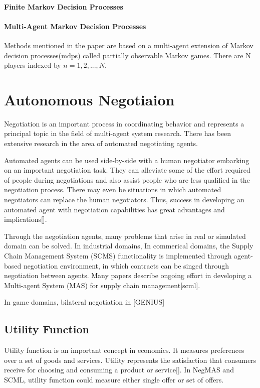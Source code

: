 \paragraph{Finite Markov Decision Processes}

\paragraph{Multi-Agent Markov Decision Processes} Methods mentioned in the paper are based on a multi-agent extension of Markov decision processes(\gls{mdps}) called partially observable Markov games. There are N players indexed by $n=1,2,...,N$.

\section{Autonomous Negotiaion} \label{autonomous-negotiation}
Negotiation is an important process in coordinating behavior and represents a principal topic in the field of multi-agent system research. There has been extensive research in the area of automated negotiating agents. 

Automated agents can be used side-by-side with a human negotiator embarking on an important negotiation task. They can alleviate some of the effort required of people during negotiations and also assist people who are less qualified in the negotiation process. There may even be situations in which automated negotiators can replace the human negotiators. Thus, success in developing an automated agent with negotiation capabilities
has great advantages and implications[].

Through the negotiation agents, many problems that arise in real or simulated domain can be solved. 
In industrial domains, 
In commerical  domains, the Supply Chain Management System (SCMS)
functionality is implemented through agent-based negotiation environment, in which contracts can be singed through negotiation between agents. Many papers describe ongoing effort in developing a Multi-agent System (MAS) for supply chain management[\gls{scml}].

In game domains, bilateral negotiation in [GENIUS]

\subsection{Utility Function}
Utility function is an important concept in economics. It measures preferences over a set of goods and services. Utility represents the satisfaction that consumers receive for choosing and consuming a product or service[]. In NegMAS and SCML, utility function could measure either single offer or set of offers.

